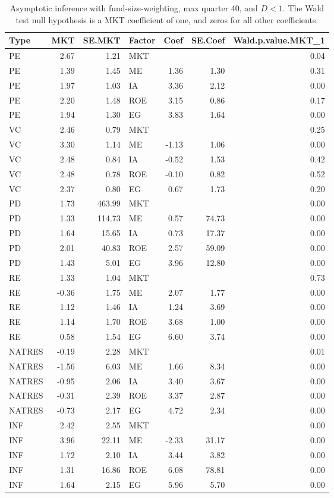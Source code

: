 \documentclass[12pt]{article}
\begin{document}
\begin{table}[ht]
	\centering
	\begin{tabular}{lrrlrrr}
		Type & MKT & SE.MKT & Factor & Coef & SE.Coef & Wald.p.value.MKT\_1 \\ 
		\hline
		\hline
		PE & 2.67 & 1.21 & MKT &  &  & 0.04 \\ 
		PE & 1.39 & 1.45 & ME & 1.36 & 1.30 & 0.31 \\ 
		PE & 1.97 & 1.03 & IA & 3.36 & 2.12 & 0.00 \\ 
		PE & 2.20 & 1.48 & ROE & 3.15 & 0.86 & 0.17 \\ 
		PE & 1.94 & 1.30 & EG & 3.83 & 1.64 & 0.00 \\ 
		\hline
		VC & 2.46 & 0.79 & MKT &  &  & 0.25 \\ 
		VC & 3.30 & 1.14 & ME & -1.13 & 1.06 & 0.00 \\ 
		VC & 2.48 & 0.84 & IA & -0.52 & 1.53 & 0.42 \\ 
		VC & 2.48 & 0.78 & ROE & -0.10 & 0.82 & 0.52 \\ 
		VC & 2.37 & 0.80 & EG & 0.67 & 1.73 & 0.20 \\ 
		\hline
		PD & 1.73 & 463.99 & MKT &  &  & 0.00 \\ 
		PD & 1.33 & 114.73 & ME & 0.57 & 74.73 & 0.00 \\ 
		PD & 1.64 & 15.65 & IA & 0.73 & 17.37 & 0.00 \\ 
		PD & 2.01 & 40.83 & ROE & 2.57 & 59.09 & 0.00 \\ 
		PD & 1.43 & 5.01 & EG & 3.96 & 12.80 & 0.00 \\ 
		\hline
		RE & 1.33 & 1.04 & MKT &  &  & 0.73 \\ 
		RE & -0.36 & 1.75 & ME & 2.07 & 1.77 & 0.00 \\ 
		RE & 1.12 & 1.46 & IA & 1.24 & 3.69 & 0.00 \\ 
		RE & 1.14 & 1.70 & ROE & 3.68 & 1.00 & 0.00 \\ 
		RE & 0.58 & 1.54 & EG & 6.60 & 3.74 & 0.00 \\
		\hline 
		NATRES & -0.19 & 2.28 & MKT &  &  & 0.01 \\ 
		NATRES & -1.56 & 6.03 & ME & 1.66 & 8.34 & 0.00 \\ 
		NATRES & -0.95 & 2.06 & IA & 3.40 & 3.67 & 0.00 \\ 
		NATRES & -0.31 & 2.39 & ROE & 3.37 & 2.87 & 0.00 \\ 
		NATRES & -0.73 & 2.17 & EG & 4.72 & 2.34 & 0.00 \\ 
		\hline
		INF & 2.42 & 2.55 & MKT &  &  & 0.00 \\ 
		INF & 3.96 & 22.11 & ME & -2.33 & 31.17 & 0.00 \\ 
		INF & 1.72 & 2.10 & IA & 3.44 & 3.82 & 0.00 \\ 
		INF & 1.31 & 16.86 & ROE & 6.08 & 78.81 & 0.00 \\ 
		INF & 1.64 & 2.15 & EG & 5.96 & 5.70 & 0.00 \\ 
		\hline
		\hline
	\end{tabular}
	\caption{Asymptotic inference with fund-size-weighting, max quarter 40, and $D<1$. The Wald test null hypothesis is a MKT coefficient of one, and zeros for all other coefficients.}
	\label{tab:ai_40_fw_indep}
\end{table}
\end{document}
